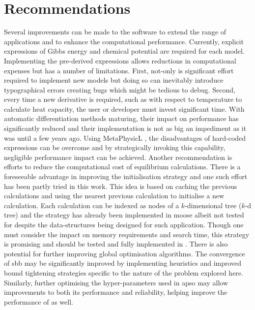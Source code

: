 \chapter{Recommendations} \label{chap:future}
	Several improvements can be made to the software to extend the range of applications and to enhance the computational performance. Currently, explicit expressions of Gibbs energy and chemical potential are required for each model. Implementing the pre-derived expressions allows reductions in computational expenses but has a number of limitations. First, not-only is significant effort required to implement new models but doing so can inevitably introduce typographical errors creating bugs which might be tedious to debug. Second, every time a new derivative is required, such as with respect to temperature to calculate heat capacity, the user or developer must invest significant time. With automatic differentiation methods maturing, their impact on performance has significantly reduced and their implementation is not as big an impediment as it was until a few years ago. Using MetaPhysicL \cite{Lindsay:2021aa}, the disadvantages of hard-coded expressions can be overcome and by strategically invoking this capability, negligible performance impact can be achieved. Another recommendation is efforts to reduce the computational cost of equilibrium calculations. There is a foreseeable advantage in improving the initialisation strategy and one such effort has been partly tried in this work. This idea is based on caching the previous calculations and using the nearest previous calculation to initialise a new calculation. Each calculation can be indexed as nodes of a $k$-dimensional tree ($k$-d tree) and the strategy has already been implemented in \gls{moose} albeit not tested for {\GEM} despite the data-structures being designed for such application. Though one must consider the impact on memory requirements and search time, this strategy is promising and should be tested and fully implemented in \GEM. There is also potential for further improving global optimisation algorithms. The convergence of \gls{sbb} may be significantly improved by implementing heuristics and improved bound tightening strategies specific to the nature of the problem explored here. Similarly, further optimising the hyper-parameters used in \gls{apso} may allow improvements to both its performance and reliability, helping improve the performance of {\GEM} as well.
	
